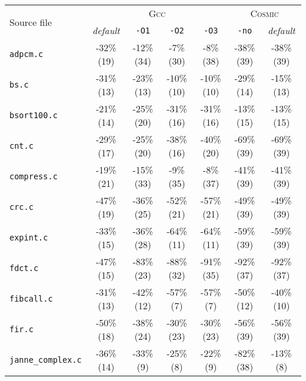 \begin{tabular}{ |l| |c|c|c|c| |c|c| }
    \hline
      \multirow{2}{*}{Source file}
    & \multicolumn{4}{c||}{\textsc{Gcc}}
    & \multicolumn{2}{c|}{\textsc{Cosmic}}
      
  \\\cline{2-7}
    & \emph{default} & \verb|-O1|     & \verb|-O2| & \verb|-O3|
    & \verb|-no|     & \emph{default}

  \\\hline
      \verb|adpcm.c|
    & -32\% (19) & -12\% (34) & -7\% (30) & -8\% (38)
    & -38\% (39) & -38\% (39)

  \\\hline
      \verb|bs.c|
    & -31\% (13) & -23\% (13) & -10\% (10) & -10\% (10)  
    & -29\% (14) & -15\% (13)

  \\\hline
      \verb|bsort100.c|
    & -21\% (14) & -25\% (20) & -31\% (16) & -31\% (16)
    & -13\% (15) & -13\% (15)
      
  \\\hline
      \verb|cnt.c|
    & -29\% (17) & -25\% (20) & -38\% (16) & -40\% (20)  
    & -69\% (39) & -69\% (39) 

  \\\hline
      \verb|compress.c|
    & -19\% (21) & -15\% (33) & -9\% (35) & -8\% (37)  
    & -41\% (39) & -41\% (39) 

  \\\hline
      \verb|crc.c|
    & -47\% (19) & -36\% (25) & -52\% (21) & -57\% (21)
    & -49\% (39) & -49\% (39) 

  \\\hline
      \verb|expint.c|
    & -33\% (15) & -36\% (28) & -64\% (11) & -64\% (11)  
    & -59\% (39) & -59\% (39) 

  \\\hline
      \verb|fdct.c|
    & -47\% (15) & -83\% (23) & -88\% (32) & -91\% (35)
    & -92\% (37) & -92\% (37)

  \\\hline
      \verb|fibcall.c|
    & -31\% (13) & -42\% (12) & -57\% (7) & -57\% (7) 
    & -50\% (12) & -40\% (10) 

  \\\hline
      \verb|fir.c|
    & -50\% (18) & -38\% (24) & -30\% (23) & -30\% (23)
    & -56\% (39) & -56\% (39) 

  \\\hline
      \verb|janne_complex.c|
    & -36\% (14) & -33\% (9) & -25\% (8) & -22\% (9) 
    & -82\% (38) & -13\% (8) 


\end{tabular}
